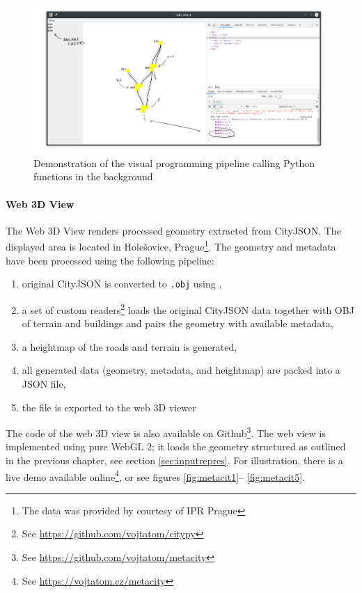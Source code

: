 \begin{figure}[h]
    \centering
    \includegraphics[width=\linewidth]{figures/editorDemo2.pdf}
    \caption{Demonstration of the visual programming pipeline calling Python functions in the background}
    \label{fig:editorDemo}
\end{figure}


\paragraph{Web 3D View}
The Web 3D View renders processed geometry extracted from CityJSON. The displayed area is located in Holešovice, Prague\footnote{The data was provided by courtesy of IPR Prague}. The geometry and metadata have been processed using the following pipeline:
\begin{enumerate}
    \item original CityJSON is converted to \verb|.obj| using \cite{cjio},
    \item a set of custom readers\footnote{See \url{https://github.com/vojtatom/citypy}} loads the original CityJSON data together with OBJ of terrain and buildings and pairs the geometry with available metadata,
    \item a heightmap of the roads and terrain is generated,
    \item all generated data (geometry, metadata, and heightmap) are packed into a JSON file,
    \item the file is exported to the web 3D viewer  
\end{enumerate}
The code of the web 3D view is also available on Github\footnote{See \url{https://github.com/vojtatom/metacity}}. The web view is implemented using pure WebGL 2; it loads the geometry structured as outlined in the previous chapter, see section \ref{sec:inputrepres}. For illustration, there is a live demo available online\footnote{See \url{https://vojtatom.cz/metacity}}, or see figures \ref{fig:metacit1}-- \ref{fig:metacit5}.


